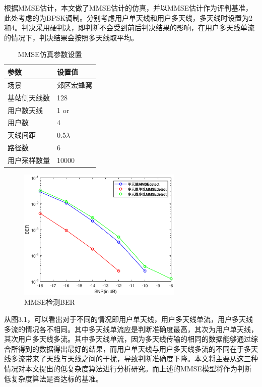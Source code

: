 \documentclass[bachelor,nocolorlinks, printoneside]{seuthesis} %
\begin{document}
\begin{Main}
根据MMSE估计，本文做了MMSE估计的仿真，并以MMSE估计作为评判基准，此处考虑的为BPSK调制。分别考虑用户单天线和用户多天线，多天线时设置为2和4。判决采用硬判决，即判断不会受到前后判决结果的影响，在用户多天线单流的情况下，判决结果会按照多天线取平均。
\begin{table}[htbp]
	\centering
	\caption{\label{tab:test}MMSE仿真参数设置}
	\begin{tabular}{ll}
		\toprule
		参数 &  设置值 \\
		\bottomrule
		场景 &  郊区宏蜂窝 \\
		\bottomrule
		基站侧天线数 & 128 \\
		\bottomrule
		用户数天线	& 1 \quad or\quad2 \\
		\bottomrule
		用户数	& 4 \\
		\bottomrule
		天线间距 & 0.5$\lambda$ \\
		\bottomrule
		路径数 & 6 \\
		\bottomrule
		用户采样数量 & 10000 \\
		\bottomrule
	\end{tabular}
\end{table}

\begin{figure}[htbp!]
	\centering \includegraphics[width=0.7\textwidth]{img/3_8.eps} \caption{MMSE检测BER}
\end{figure}

从图3.1，可以看出对于不同的情况即用户单天线，用户多天线单流，用户多天线多流的情况各不相同。其中多天线单流应是判断准确度最高，其次为用户单天线，其次用户多天线多流。其中多天线单流，因为多天线传输的相同的数据能够通过综合所得到的数据得出最好的结果，而用户单天线与用户多天线多流的不同在于多天线多流带来了天线与天线之间的干扰，导致判断准确度下降。本文将主要从这三种情况对本文提出的低复杂度算法进行分析研究。而上述的MMSE模型将作为判断低复杂度算法是否达标的基准。



\end{Main}
\end{document}
